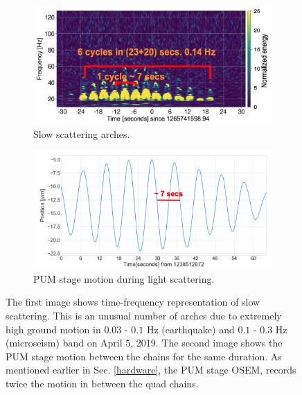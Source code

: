 \documentclass[12pt]{iopart}
\begin{document}
\begin{figure}[h]
\captionsetup[subfigure]{font=scriptsize,labelfont=scriptsize}
   \centering
    \begin{subfigure}[b]{0.45\textwidth}
        \centering
         \includegraphics[width= \textwidth]{slow_arch2.png}
         \caption{Slow scattering arches.}
         \label{fig:slowscat}
    \end{subfigure}
    \hfill
    \begin{subfigure}[b]{0.45\textwidth}
        \centering
         \includegraphics[width =\textwidth]{ts_sus2.png}
         \caption{PUM stage motion during light scattering.}
         \label{fig:timeseriessus}
         
    
    \end{subfigure}
    \caption{The first image shows time-frequency representation of  slow scattering. This is an unusual number of arches due to extremely high ground motion in  $0.03$ - $0.1$ Hz (earthquake) and $0.1$ - $0.3$  Hz (microseism) band on April 5, 2019. The second image shows the PUM stage motion between the chains for the same duration. As mentioned earlier in Sec. \ref{hardware}, the PUM stage OSEM, records twice the motion in between the quad chains.}
    \label{fig:slowscat_sus}
    
\end{figure}
\end{document}
